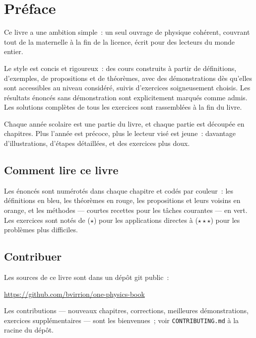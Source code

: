 \chapter{Préface}

Ce livre a une ambition simple~: un seul ouvrage de physique cohérent,
couvrant tout de la maternelle à la fin de la licence, écrit pour des
lecteurs du monde entier.

Le style est concis et rigoureux~: des cours construits à partir de
définitions, d'exemples, de propositions et de théorèmes, avec des
démonstrations dès qu'elles sont accessibles au niveau considéré, suivis
d'exercices soigneusement choisis. Les résultats énoncés sans démonstration
sont explicitement marqués comme admis. Les solutions complètes de tous les
exercices sont rassemblées à la fin du livre.

Chaque année scolaire est une partie du livre, et chaque partie est découpée
en chapitres. Plus l'année est précoce, plus le lecteur visé est jeune~:
davantage d'illustrations, d'étapes détaillées, et des exercices plus doux.

\section*{Comment lire ce livre}

Les énoncés sont numérotés dans chaque chapitre et codés par couleur~: les
définitions en bleu, les théorèmes en rouge, les propositions et leurs
voisins en orange, et les méthodes --- courtes recettes pour les tâches
courantes --- en vert. Les exercices sont notés de ($\star$) pour les
applications directes à ($\star\star\star$) pour les problèmes plus
difficiles.

\section*{Contribuer}

Les sources de ce livre sont dans un dépôt git public~:
\begin{center}
\url{https://github.com/bvirrion/one-physics-book}
\end{center}
Les contributions --- nouveaux chapitres, corrections, meilleures
démonstrations, exercices supplémentaires --- sont les bienvenues~; voir
\texttt{CONTRIBUTING.md} à la racine du dépôt.
